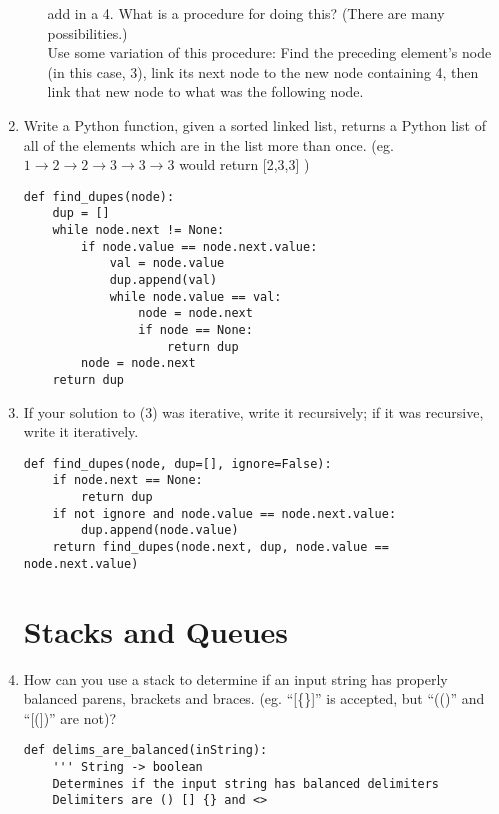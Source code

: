 \documentclass[11pt]{article}
\newenvironment{answer}{\large\lstset{basicstyle=\large}\color{white}}{}
\newenvironment{answer}{\large\lstset{basicstyle=\large}\color{red}}{}
\begin{document}
\begin{enumerate}
\begin{enumerate}
                  add in a 4. What is a procedure for doing this? (There are
                  many possibilities.) \\
                \begin{answer}
				Use some variation of this procedure: Find the preceding element's node (in this case, 3), link its next node to the new node containing 4, then link that new node to what was the following node.
				\end{answer}
        \end{enumerate}
    \item Write a Python function, given a sorted linked list, returns a Python
    list of all of the elements which are in the list more than once. (eg.
    $1\rightarrow2\rightarrow2\rightarrow3\rightarrow3\rightarrow3$ would return [2,3,3] )
        \vspace{3in}
\begin{answer}
\begin{lstlisting}
def find_dupes(node):
	dup = []
	while node.next != None:
		if node.value == node.next.value:
			val = node.value
			dup.append(val)
			while node.value == val:
				node = node.next
				if node == None:
					return dup
		node = node.next
	return dup
\end{lstlisting}
\end{answer}
    \item If your solution to (3) was iterative, write it recursively; if it
    was recursive, write it iteratively.
\begin{answer}
\begin{lstlisting}
def find_dupes(node, dup=[], ignore=False):
	if node.next == None:
		return dup
	if not ignore and node.value == node.next.value:
		dup.append(node.value)
	return find_dupes(node.next, dup, node.value == node.next.value)
\end{lstlisting}
\end{answer}
        \pagebreak

\section*{Stacks and Queues}
\item How can you use a stack to determine if an input string has properly
      balanced parens, brackets and braces. (eg. ``[\{\}]'' is accepted, but
      ``(()'' and ``[(])'' are not)?

    \begin{answer}
    \begin{lstlisting} 
def delims_are_balanced(inString):
    ''' String -> boolean
    Determines if the input string has balanced delimiters
    Delimiters are () [] {} and <>  
    

\end{lstlisting}
\end{answer}
\end{enumerate}
\end{document}

